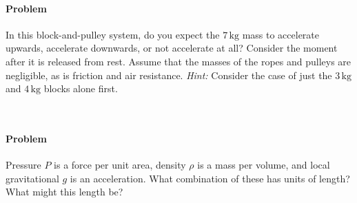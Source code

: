 \documentclass[12pt]{article}
\newcommand{\kg}{\mathrm{kg}}
\newcounter{problem}
\begin{document}
\paragraph{Problem~\theproblem}%
In this block-and-pulley system, do you expect the $7\,\kg$ mass to
accelerate upwards, accelerate downwards, or not accelerate at all?
Consider the moment after it is released from rest.  Assume that the
masses of the ropes and pulleys are negligible, as is friction and air
resistance.  \emph{Hint:} Consider the case of just the $3\,\kg$ and
$4\,\kg$ blocks alone first.
%

~ \vfill ~

\clearpage

\paragraph{Problem~\theproblem}%
Pressure $P$ is a force per unit area, density $\rho$ is a mass per
volume, and local gravitational $g$ is an acceleration.  What
combination of these has units of length?  What might this length be?
\end{document}
